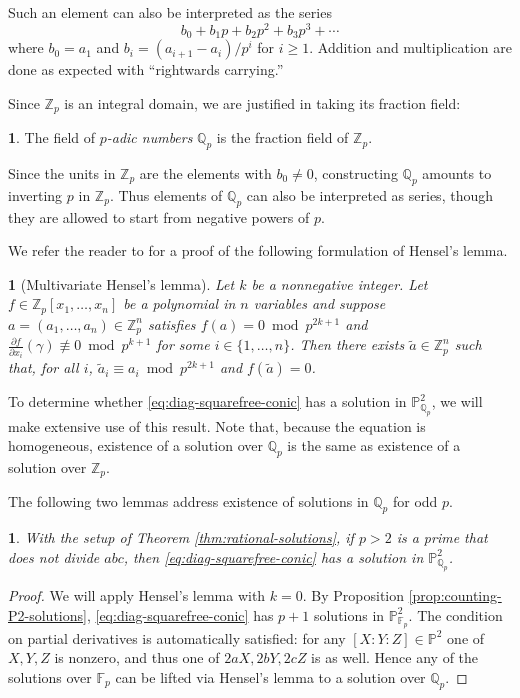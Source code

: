 \documentclass[10pt,a4paper]{amsart}
\numberwithin{equation}{section}
\numberwithin{figure}{section}
\numberwithin{table}{section}
\theoremstyle{definition}
\theoremstyle{plain}
\theoremstyle{remark}
\theoremstyle{plain}
\theoremstyle{definition}
\newtheorem{defn}[thm]{\protect\definitionname}
\theoremstyle{plain}
\theoremstyle{plain}
\newtheorem{lem}[thm]{\protect\lemmaname}
\providecommand{\definitionname}{Definition}
\providecommand{\lemmaname}{Lemma}
\renewcommand{\P}{\mathbb{P}}
\newcommand{\F}{\mathbb{F}}
\newcommand{\Z}{\mathbb{Z}}
\newcommand{\Q}{\mathbb{Q}}
\begin{document}
	Such an element can also be interpreted as the series
	\[
	b_0 + b_1 p + b_2 p^2 + b_3 p^3 + \cdots
	\]
	where $b_0 = a_1$ and $b_i = (a_{i+1} - a_i)/p^i$ for $i \geq 1$. Addition and multiplication are done as expected with ``rightwards carrying.''
	
	Since $\Z_p$ is an integral domain, we are justified in taking its fraction field:
	\begin{defn}
		The field of \emph{$p$-adic numbers} $\Q_p$ is the fraction field of $\Z_p$.
	\end{defn}
	Since the units in $\Z_p$ are the elements with $b_0 \neq 0$, constructing $\Q_p$ amounts to inverting $p$ in $\Z_p$. Thus elements of $\Q_p$ can also be interpreted as series, though they are allowed to start from negative powers of $p$.
	
	We refer the reader to \cite[Thm.~6.7]{bilu} for a proof of the following formulation of Hensel's lemma.
	\begin{lem}[Multivariate Hensel's lemma]\label{thm:hensels-one-eq}
		Let $k$ be a nonnegative integer. Let $f \in \Z_p[x_1,\ldots,x_n]$ be a polynomial in $n$ variables and suppose $a = (a_1,\ldots,a_n)\in \Z_p^n$ satisfies $f(a) = 0 \bmod {p^{2k+1}}$ and $\frac{\partial f}{\partial x_i}(\gamma) \not\equiv 0 \bmod {p^{k+1}}$ for some $i\in \{1,\ldots,n\}$. Then there exists $\widetilde{a} \in \Z_p^n$ such that, for all $i$, $\widetilde{a}_i\equiv a_i \bmod {p^{2k+1}}$ and $f(\widetilde{a}) = 0$.
	\end{lem}
	To determine whether \eqref{eq:diag-squarefree-conic} has a solution in $\P^2_{\Q_p}$, we will make extensive use of this result. Note that, because the equation is homogeneous, existence of a solution over $\Q_p$ is the same as existence of a solution over $\Z_p$.
	
	The following two lemmas address existence of solutions in $\Q_p$ for odd $p$.
	\begin{lem}
		With the setup of Theorem \ref{thm:rational-solutions}, if $p > 2$ is a prime that does not divide $abc$, then \eqref{eq:diag-squarefree-conic} has a solution in $\P^2_{\Q_p}$.
	\end{lem}
	\begin{proof}
		We will apply Hensel's lemma with $k=0$. By Proposition \ref{prop:counting-P2-solutions}, \eqref{eq:diag-squarefree-conic} has $p+1$ solutions in $\P^2_{\F_p}$. The condition on partial derivatives is automatically satisfied: for any $[X:Y:Z]\in \P^2$ one of $X,Y,Z$ is nonzero, and thus one of $2aX, 2bY, 2cZ$ is as well. Hence any of the solutions over $\F_p$ can be lifted via Hensel's lemma to a solution over $\Q_p$.
	\end{proof}
	
\end{document}
